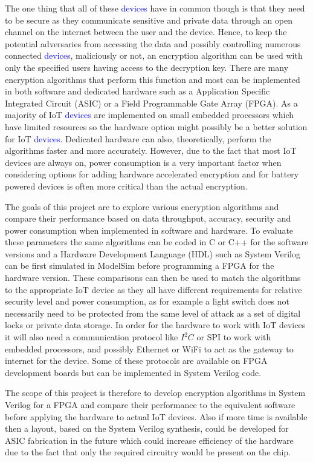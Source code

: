 \documentclass[12pt,twoside,a4paper]{report}
\begin{document}
    The one thing that all of these \textcolor{blue}{devices} have in common though is that they need to be secure as they communicate sensitive and private data through an open channel on the internet between the user and the device. Hence, to keep the potential adversaries from accessing the data and possibly controlling numerous connected \textcolor{blue}{devices}, maliciously or not, an encryption algorithm can be used with only the specified users having access to the decryption key. There are many encryption algorithms that perform this function and most can be implemented in both software and dedicated hardware such as a Application Specific Integrated Circuit (ASIC) or a Field Programmable Gate Array (FPGA). As a majority of IoT \textcolor{blue}{devices} are implemented on small embedded processors which have limited resources so the hardware option might possibly be a better solution for IoT \textcolor{blue}{devices}. Dedicated hardware can also, theoretically, perform the algorithms faster and more accurately. However, due to the fact that most IoT devices are always on, power consumption is a very important factor when considering options for adding hardware accelerated encryption and for battery powered devices is often more critical than the actual encryption.
    
    The goals of this project are to explore various encryption algorithms and compare their performance based on data throughput, accuracy, security and power consumption when implemented in software and hardware. To evaluate these parameters the same algorithms can be coded in C or C++ for the software versions and a Hardware Development Language (HDL) such as System Verilog can be first simulated in ModelSim before programming a FPGA for the hardware version. These comparisons can then be used to match the algorithms to the appropriate IoT device as they all have different requirements for relative security level and power consumption, as for example a light switch does not necessarily need to be protected from the same level of attack as a set of digital locks or private data storage. In order for the hardware to work with IoT devices it will also need a communication protocol like $I^2 C$ or SPI to work with embedded processors, and possibly Ethernet or WiFi to act as the gateway to internet for the device. Some of these protocols are available on FPGA development boards but can be implemented in System Verilog code.
    
    The scope of this project is therefore to develop encryption algorithms in System Verilog for a FPGA and compare their performance to the equivalent software before applying the hardware to actual IoT devices. Also if more time is available then a layout, based on the System Verilog synthesis, could be developed for ASIC fabrication in the future which could increase efficiency of the hardware due to the fact that only the required circuitry would be present on the chip.
    
\end{document}
